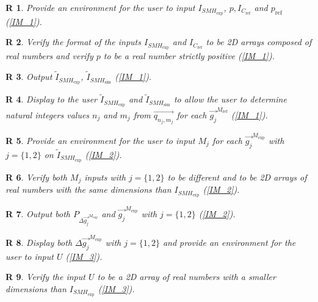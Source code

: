 \documentclass[12pt]{article}
\newtheorem{R}{R}
\begin{document}
\begin{R}
\label{R_1}
\normalfont Provide an environment for the user to input 
$I_{\mathit{SMH}_{\text{exp}}}$, $p,  I_{C_{\text{ref}}}$ and $p_{\text{ref}}$ 
(\cref{IM_1}).
\end{R}
\begin{R}
\label{R_2}
\normalfont Verify the format of the inputs $I_{\mathit{SMH}_{\text{exp}}}$ and 
$I_{C_{\text{ref}}}$ to be 2D arrays composed of real numbers and verify $p$ to 
be a real number strictly positive (\cref{IM_1}).
\end{R}
\begin{R}
\label{R_3}
\normalfont Output $\widetilde{I}_{\mathit{SMH}_{\text{exp}}}$, 
$\widetilde{I}_{\mathit{SMH}_{\text{sim}}}$ (\cref{IM_1}).
\end{R}
\begin{R}
\label{R_4}
\normalfont Display to the user $\widetilde{I}_{\mathit{SMH}_{\text{exp}}}$ and 
$\widetilde{I}_{\mathit{SMH}_{\text{sim}}}$ to allow the user to determine 
natural integers values $n_j$ and $m_j$ from $\overrightarrow{q_{n_j,m_j}}$ for 
each $\overrightarrow{g_j}^{M_{\text{ref}}}$ (\cref{IM_1}).
\end{R}
\begin{R}
\label{R_5}
\normalfont Provide an environment for the user to input $M_j$ for each 
$\overrightarrow{g_{j}}^{M_{\text{exp}}}$ with $j=\{1,2\}$ on 
$\widetilde{I}_{\mathit{SMH}_{\text{exp}}}$ (\cref{IM_2}).
\end{R}
\begin{R}
\label{R_6}
\normalfont Verify both $M_j$ inputs with $j=\{1,2\}$ to be different and to be 
2D arrays of real numbers with the same dimensions than 
$I_{\mathit{SMH}_{\text{exp}}}$ (\cref{IM_2}).
\end{R}
\begin{R}
\label{R_7}
\normalfont Output both $P_{\Delta \overrightarrow{g_{j}}^{M_{\text{exp}}}}$ and 
$\overrightarrow{g_{j}}^{M_{\text{exp}}}$ with $j=\{1,2\}$ (\cref{IM_2}).
\end{R}
\begin{R}
\label{R_8}
\normalfont Display both $\Delta \overrightarrow{g_{j}}^{M_{\text{exp}}}$  with 
$j=\{1,2\}$ and provide an environment for the user to input $U$ (\cref{IM_3}).
\end{R}
\begin{R}
\label{R_9}
\normalfont Verify the input $U$ to be a 2D array of real numbers with a smaller 
dimensions than $I_{\mathit{SMH}_{\text{exp}}}$ (\cref{IM_3}).
\end{R}
\end{document}
